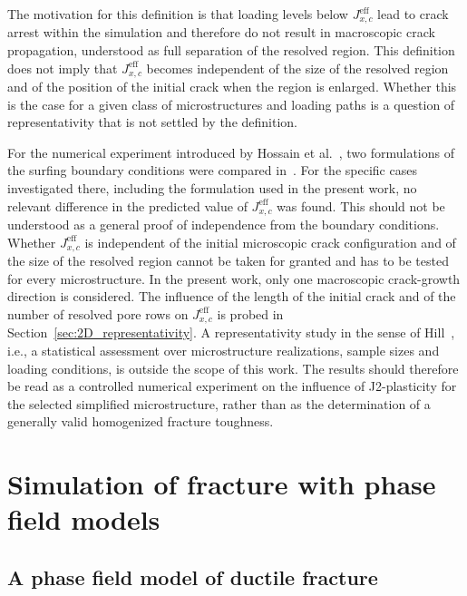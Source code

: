 \documentclass[pdflatex,sn-mathphys-num]{sn-jnl}%
\theoremstyle{thmstyleone}%
\theoremstyle{thmstyletwo}%
\theoremstyle{thmstylethree}%
\begin{document}
The motivation for this definition is that loading levels below $J_{x,c}^{\text{eff}}$ lead to crack arrest within the simulation and 
therefore do not result in macroscopic crack propagation, 
understood as full separation of the resolved region.
This definition does not imply that $J_{x,c}^{\text{eff}}$ becomes independent of the size of the resolved region and of the position of the initial crack when the region is enlarged. Whether this is the case for a given class of microstructures and loading paths is a question of representativity that is not settled by the definition.

For the numerical experiment introduced by Hossain et al.~\cite{hossain_effective_2014}, two formulations of the surfing boundary conditions were compared in~\cite{hossain_effective_2014, bohnen_simulation_2024}. For the specific cases investigated there, including the formulation used in the present work, no relevant difference in the predicted value of $J_{x,c}^{\text{eff}}$ was found. This should not be understood as a general proof of independence from the boundary conditions.
Whether $J_{x,c}^{\text{eff}}$ is independent of the initial microscopic crack configuration and of the size of the resolved region cannot be taken for granted and has to be tested for every microstructure. In the present work, only one macroscopic crack-growth direction is considered. The influence of the length of the initial crack and of the number of resolved pore rows on $J_{x,c}^{\text{eff}}$ is probed in Section~\ref{sec:2D_representativity}. A representativity study in the sense of Hill~\cite{hill_elastic_1963}, i.e., a statistical assessment over microstructure realizations, sample sizes and loading conditions, is outside the scope of this work. The results should therefore be read as a controlled numerical experiment on the influence of J2-plasticity for the selected simplified microstructure, rather than as the determination of a generally valid homogenized fracture toughness.


\section{Simulation of fracture with phase field models}\label{sec:simulation_phase_field_models}



\subsection{A phase field model of ductile fracture}\label{sec:phase_fiel_model_ductile}
\end{document}
